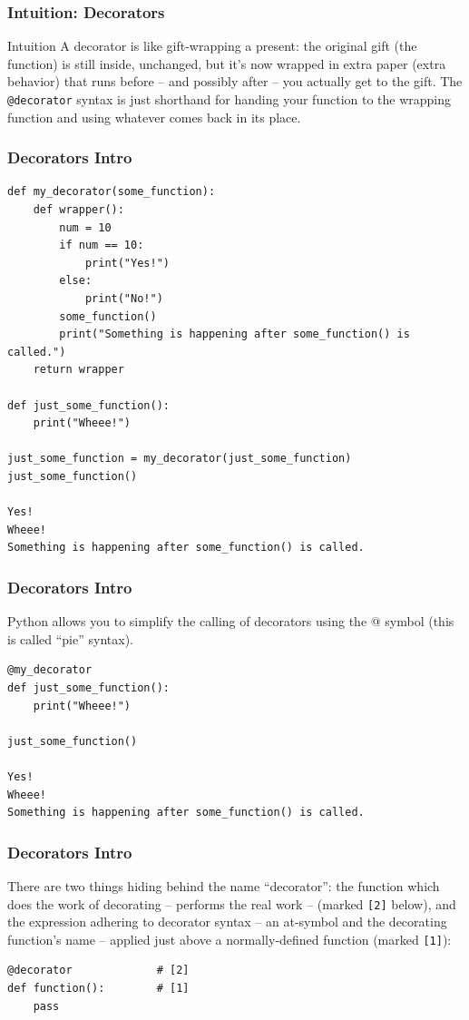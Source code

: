 \begin{frame}[fragile]\frametitle{Intuition: Decorators}
\begin{block}{Intuition}
A decorator is like gift-wrapping a present: the original gift (the function) is still inside,
unchanged, but it's now wrapped in extra paper (extra behavior) that runs before -- and possibly
after -- you actually get to the gift. The \texttt{@decorator} syntax is just shorthand for
handing your function to the wrapping function and using whatever comes back in its place.
\end{block}
\end{frame}

\begin{frame}[fragile]\frametitle{Decorators Intro}
        \begin{lstlisting}
def my_decorator(some_function):
    def wrapper():
        num = 10
        if num == 10:
            print("Yes!")
        else:
            print("No!")
        some_function()
        print("Something is happening after some_function() is called.")
    return wrapper

def just_some_function():
    print("Wheee!")

just_some_function = my_decorator(just_some_function)
just_some_function()

Yes!
Wheee!
Something is happening after some_function() is called.
\end{lstlisting}
\end{frame}

\begin{frame}[fragile]\frametitle{Decorators Intro}
Python allows you to simplify the calling of decorators using the @ symbol (this is called “pie” syntax).
        \begin{lstlisting}
@my_decorator
def just_some_function():
    print("Wheee!")

just_some_function()

Yes!
Wheee!
Something is happening after some_function() is called.
\end{lstlisting}
\end{frame}

\begin{frame}[fragile]\frametitle{Decorators Intro}
There are two things hiding behind the name ``decorator'': the function which does the work of
decorating -- performs the real work -- (marked \texttt{[2]} below), and the expression
adhering to decorator syntax -- an at-symbol and the decorating function's name -- applied just
above a normally-defined function (marked \texttt{[1]}):
        \begin{lstlisting}
@decorator             # [2]
def function():        # [1]
    pass
\end{lstlisting}
\end{frame}

